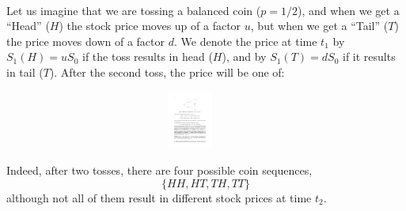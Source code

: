 \documentclass[smaller]{beamer}\usepackage[]{graphicx}\usepackage[]{color}
\begin{document}
\begin{frame}{\secname}
  \framesubtitle{\subsecname}
  \begin{example}
\begin{footnotesize}
  Let us imagine that we are tossing a balanced coin ($p=1/2$), and when we get a ``Head'' ($H$) the stock price moves up of a factor $u$, but when we get a ``Tail'' ($T$) the price moves down of a factor $d$. We denote the price at time $t_1$  by $S_1(H)=u S_0 $ if the toss results in head ($H$), and by $S_1(T)=d S_0 $  if it results in tail ($T$). After the second toss, the price will be one of:
  \begin{figure}[ptb]\centering
  \includegraphics[height=0.75in, width=4in]{img/Shreve_Bin.pdf}%
  \end{figure}%
  Indeed, after two tosses, there are four possible coin sequences,
  $$
  \{HH,HT,TH,TT\}
  $$
  although not all of them result in different stock prices at time  $t_2$.
  \end{footnotesize}
  \end{example}
\end{frame}%
\end{document}
